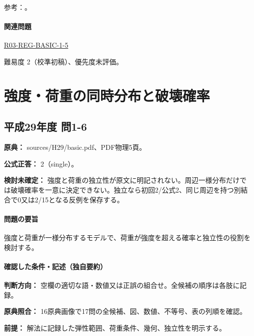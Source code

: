 \par 参考：\cite{struct_mlit_limit}。

\paragraph{関連問題} \hyperref[q:r03-reg-basic-1-5]{R03-REG-BASIC-1-5}

\par 難易度 2（校準初稿）、優先度未評価。

\section{強度・荷重の同時分布と破壊確率}

\subsection{平成29年度 問1-6}
\label{q:h29-reg-basic-1-6}

\noindent\textbf{原典：} sources/H29/basic.pdf、PDF物理5頁。

\textbf{公式正答：} 2（single）。

\par\textbf{検討未確定：} 強度と荷重の独立性が原文に明記されない。周辺一様分布だけでは破壊確率を一意に決定できない。独立なら初回2/公式2、同じ周辺を持つ別結合で0又は2/15となる反例を保存する。

\paragraph{問題の要旨} 強度と荷重が一様分布するモデルで、荷重が強度を超える確率と独立性の役割を検討する。

\paragraph{確認した条件・記述（独自要約）}\mbox{}\par

\noindent\textbf{判断方向：} 空欄の適切な語・数値又は正誤の組合せ。全候補の順序は各肢に記録。\par

\noindent\textbf{原典照合：} 16原典画像で17問の全候補、図、数値、不等号、表の列順を確認。\par

\noindent\textbf{前提：} 解法に記録した弾性範囲、荷重条件、幾何、独立性を明示する。\par

